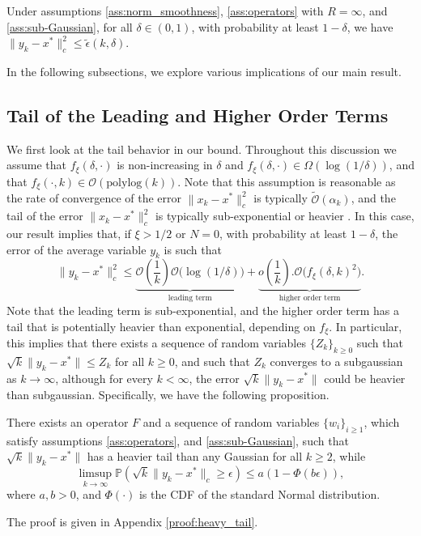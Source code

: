 \documentclass[letterpaper, 10 pt]{article}
\begin{document}
\begin{corollary}
    Under assumptions \ref{ass:norm_smoothness}, \ref{ass:operators} with $R=\infty$, and \ref{ass:sub-Gaussian}, for all $\delta\in (0,1)$, with probability at least $1-\delta$, we have $\|y_k-x^*\|^2_c\leq \tilde{\epsilon}(k,\delta)$. 
\end{corollary}


In the following subsections, we explore various implications of our main result.

\subsection{Tail of the Leading and Higher Order Terms}

We first look at the tail behavior in our bound. Throughout this discussion we assume that $f_\xi(\delta, \cdot)$ is non-increasing in $\delta$ and $f_\xi(\delta, \cdot)\in\Omega (\log(1/\delta))$, and that $f_\xi(\cdot,k) \in \mathcal{O}(\text{polylog}(k))$. Note that this assumption is reasonable as the rate of convergence of the error $\|x_k-x^*\|^2_c$ is typically $\tilde{\mathcal{O}}(\alpha_k)$, and the tail of the error $\|x_k-x^*\|_c^2$ is typically sub-exponential or heavier \cite{chen2023concentration}. In this case, our result implies that, if $\xi>1/2$ or $N=0$, with probability at least $1-\delta$, the error of the average variable $y_k$ is such that
\[ \|y_k-x^*\|^2_c \leq \underbrace{\mathcal{O}\left(\frac{1}{k}\right)\mathcal{O}\big(\log(1/\delta)\big)}_{\text{leading term}}+\underbrace{o\left(\frac{1}{k}\right).\mathcal{O}\Big(f_\xi(\delta,k)^2\Big)}_{\text{higher order term}}. \]
Note that the leading term is sub-exponential, and the higher order term has a tail that is potentially heavier than exponential, depending on $f_\xi$. In particular, this implies that there exists a sequence of random variables $\{Z_k\}_{k\geq 0}$ such that $\sqrt{k}\|y_k-x^*\|\leq Z_k$ for all $k\geq 0$, and such that $Z_k$ converges to a subgaussian as $k\rightarrow\infty$, although for every $k<\infty$, the error $\sqrt{k}\|y_k-x^*\|$ could be heavier than subgaussian. Specifically, we have the following proposition.

\begin{proposition}\label{prop:heavy_tail}
    There exists an operator $F$ and a sequence of random variables $\{w_i\}_{i\geq 1}$, which satisfy assumptions \ref{ass:operators}, and \ref{ass:sub-Gaussian}, such that $\sqrt{k}\|y_k-x^*\|$ has a heavier tail than any Gaussian for all $k\geq 2$, while 
    \[ \limsup_{k \rightarrow\infty}\mathbb{P}\left(\sqrt{k}\|y_k- x^*\|_c \geq \epsilon \right) \leq a(1-\Phi(b\epsilon)), \]
    where $a,b> 0$, and $\Phi(\cdot)$ is the CDF of the standard Normal distribution.
\end{proposition}
The proof is given in Appendix \ref{proof:heavy_tail}.\\
\end{document}
